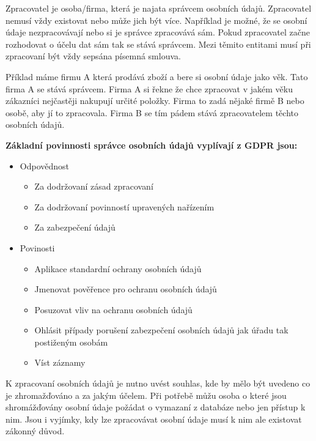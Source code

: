 Zpracovatel je osoba/firma, která je najata správcem osobních údajů. Zpracovatel nemusí vždy existovat nebo může jich být více. Například je možné, že se osobní údaje nezpracovávají nebo si je správce zpracovává sám. Pokud zpracovatel začne rozhodovat o účelu dat sám tak se stává správcem.\newline
Mezi těmito entitami musí při zpracovaní být vždy sepsána písemná smlouva.

Příklad máme firmu A která prodává zboží a bere si osobní údaje jako věk. Tato firma A se stává správcem. Firma A si řekne že chce zpracovat v jakém věku zákazníci nejčastěji nakupují určité položky. Firma to zadá nějaké firmě B nebo osobě, aby jí to zpracovala. Firma B se tím pádem stává zpracovatelem těchto osobních údajů.

\vspace{0.5cm} 
\noindent\textbf{Základní povinnosti správce osobních údajů vyplívají z GDPR jsou:}
\begin{itemize}[noitemsep]
    \item Odpovědnost
    \begin{itemize}[noitemsep]
        \item Za dodržovaní zásad zpracovaní
        \item Za dodržovaní povinností upravených nařízením
        \item Za zabezpečení údajů
    \end{itemize}
    \item Povinosti
    \begin{itemize}[noitemsep]
        \item Aplikace standardní ochrany osobních údajů
        \item Jmenovat pověřence pro ochranu osobních údajů
        \item Posuzovat vliv na ochranu osobních údajů
        \item Ohlásit případy porušení zabezpečení osobních údajů jak úřadu tak postiženým osobám
        \item Víst záznamy
    \end{itemize}
\end{itemize}

K zpracovaní osobních údajů je nutno uvést souhlas, kde by mělo být uvedeno co je zhromažďováno a za jakým účelem. Při potřebě můžu osoba o které jsou shromážďovány osobní údaje požádat o vymazaní z databáze nebo jen přístup k nim. Jsou i vyjímky, kdy lze zpracovávat osobní údaje musí k nim ale existovat zákonný důvod.

